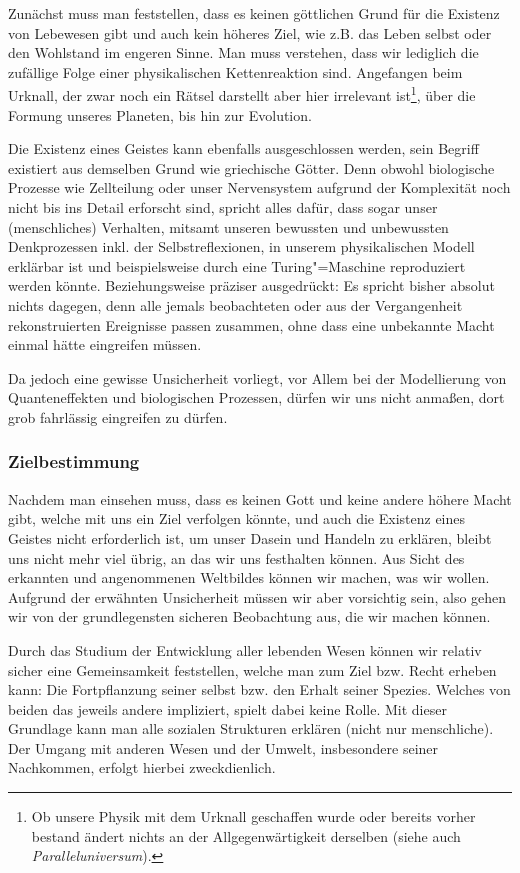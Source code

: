 Zunächst muss man feststellen, dass es keinen göttlichen Grund für die Existenz von Lebewesen gibt und auch kein höheres Ziel, wie z.B. das Leben selbst oder den Wohlstand im engeren Sinne. Man muss verstehen, dass wir lediglich die zufällige Folge einer physikalischen Kettenreaktion sind. Angefangen beim Urknall, der zwar noch ein Rätsel darstellt aber hier irrelevant ist\footnote{Ob unsere Physik mit dem Urknall geschaffen wurde oder bereits vorher bestand ändert nichts an der Allgegenwärtigkeit derselben (siehe auch \textit{Paralleluniversum}).}, über die Formung unseres Planeten, bis hin zur Evolution.

Die Existenz eines Geistes kann ebenfalls ausgeschlossen werden, sein Begriff existiert aus demselben Grund wie griechische Götter. Denn obwohl biologische Prozesse wie Zellteilung oder unser Nervensystem aufgrund der Komplexität noch nicht bis ins Detail erforscht sind, spricht alles dafür, dass sogar unser (menschliches) Verhalten, mitsamt unseren bewussten und unbewussten Denkprozessen inkl. der Selbstreflexionen, in unserem physikalischen Modell erklärbar ist und beispielsweise durch eine Turing"=Maschine reproduziert werden könnte. Beziehungsweise präziser ausgedrückt: Es spricht bisher absolut nichts dagegen, denn alle jemals beobachteten oder aus der Vergangenheit rekonstruierten Ereignisse passen zusammen, ohne dass eine unbekannte Macht einmal hätte eingreifen müssen.

Da jedoch eine gewisse Unsicherheit vorliegt, vor Allem bei der Modellierung von Quanteneffekten und biologischen Prozessen, dürfen wir uns nicht anmaßen, dort grob fahrlässig eingreifen zu dürfen.

\subsubsection{Zielbestimmung}

Nachdem man einsehen muss, dass es keinen Gott und keine andere höhere Macht gibt, welche mit uns ein Ziel verfolgen könnte, und auch die Existenz eines Geistes nicht erforderlich ist, um unser Dasein und Handeln zu erklären, bleibt uns nicht mehr viel übrig, an das wir uns festhalten können. Aus Sicht des erkannten und angenommenen Weltbildes können wir machen, was wir wollen. Aufgrund der erwähnten Unsicherheit müssen wir aber vorsichtig sein, also gehen wir von der grundlegensten sicheren Beobachtung aus, die wir machen können.

Durch das Studium der Entwicklung aller lebenden Wesen können wir relativ sicher eine Gemeinsamkeit feststellen, welche man zum Ziel bzw. Recht erheben kann: Die Fortpflanzung seiner selbst bzw. den Erhalt seiner Spezies. Welches von beiden das jeweils andere impliziert, spielt dabei keine Rolle. Mit dieser Grundlage kann man alle sozialen Strukturen erklären (nicht nur menschliche). Der Umgang mit anderen Wesen und der Umwelt, insbesondere seiner Nachkommen, erfolgt hierbei zweckdienlich.

